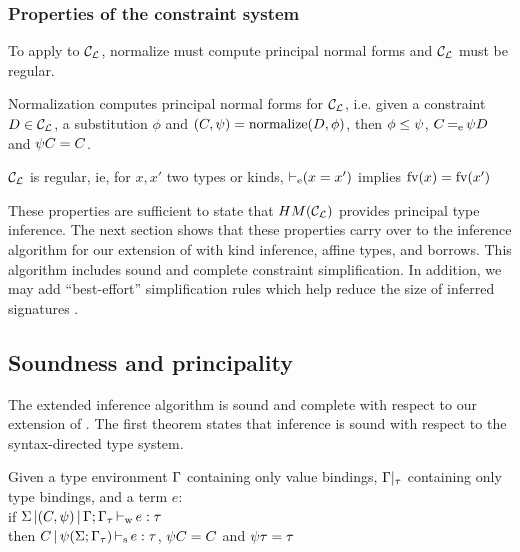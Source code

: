 \subsubsection{Properties of the constraint system}

To apply \hmx to ${\mathcal C_{\mathcal L}}$, normalize must compute principal normal forms
and ${\mathcal C_{\mathcal L}}$ must be regular.

\begin{property}
  Normalization computes principal normal forms for ${\mathcal C_{\mathcal L}}$, i.e.
  given a constraint $D\in{\mathcal C_{\mathcal L}}$, a substitution $\phi$ and
  $(C,\mathrm{\psi}) = \operatorname{normalize}(D,\phi)$,
  then $\phi\leq\mathrm{\psi}$,
  $C \operatorname{=_e} \mathrm{\psi} D$ and
  $\mathrm{\psi} C = C$.
\end{property}

\begin{property}
  ${\mathcal C_{\mathcal L}}$ is regular, ie, for $x, x'$ two types or kinds,
  $\operatorname{\vdash_e} (x = x')$ implies
  $\operatorname{fv}(x) = \operatorname{fv}(x')$
\end{property}

These properties
are sufficient to state that $HM({\mathcal C_{\mathcal L}})$ provides principal type inference.
The next section shows that these properties carry over to the
inference algorithm for our extension
of \hmx
with kind inference, affine types, and borrows.
%
This algorithm includes sound and complete constraint simplification.
In addition, we may add ``best-effort'' simplification
rules which help reduce the size of inferred signatures 
\citep{DBLP:conf/aplas/Simonet03}.

\subsection{Soundness and principality}

The extended inference algorithm is sound
and complete with respect to our extension of \hmx.
%
The first theorem states that inference is sound
with respect to the syntax-directed type system.

\begin{theorem}
  Given a type environment $\Gamma$ containing only value bindings,
  $\Gamma|_\tau$ containing only type bindings, and a term $e$:\\
  if $\Sigma \operatorname{|} (C,\mathrm{\psi}) \operatorname{|} \Gamma;\Gamma_\tau \operatorname{\vdash_w} e : \tau$\\
  then $C \operatorname{|} \mathrm{\psi}(\Sigma;\Gamma_\tau) \operatorname{\vdash_s} e : \tau$, $\mathrm{\psi} C = C$ and $\mathrm{\psi} \tau = \tau$
\end{theorem}

